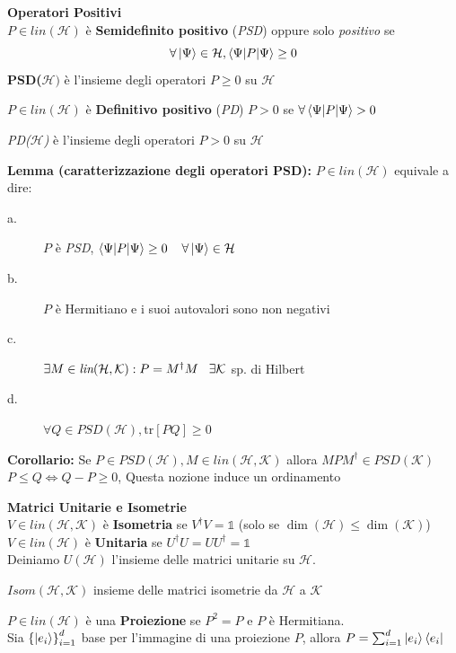 \documentclass{report}
\begin{document}
\medskip
\textbf{Operatori Positivi}
\\$P \in \textit{lin}(\mathcal{H})$ è \textbf{Semidefinito positivo} (\textit{PSD}) oppure solo \textit{positivo} se
$$\forall \ket{\Psi} \in \mathcal{H}, \braket{\Psi|P|\Psi} \ge 0$$
\textbf{PSD($\mathcal{H})$} è l'insieme degli operatori $P\ge 0$ su $\mathcal{H}$
\medskip

$P \in \textit{lin}(\mathcal{H})$ è \textbf{Definitivo positivo} (\textit{PD}) $P > 0$ se $\forall \braket{\Psi|P| \Psi} > 0$

\medskip
\textit{PD($\mathcal{H}$)} è l'insieme degli operatori $P > 0$ su $\mathcal{H}$

\medskip 
\textbf{Lemma (caratterizzazione degli operatori PSD):} $P \in \textit{lin}(\mathcal{H})$ equivale a dire:
\begin{description}
    \item[a.] $P$ è \textit{PSD}, $\braket{\Psi|P|\Psi} \ge 0 \hspace{0.4cm} \forall\ket{\Psi}\in\mathcal{H}$ 
    \item[b.] $P$ è Hermitiano e i suoi autovalori sono non negativi
    \item[c.] $\exists M \in \textit{lin}(\mathcal{H,K}):P=M^\dagger M \hspace{0.3cm} \exists \mathcal{K}$ sp. di Hilbert
    \item[d.] $\forall Q \in PSD(\mathcal{H}), \text{tr}[PQ] \ge 0$
\end{description}
\textbf{Corollario:} Se $P \in PSD(\mathcal{H}), M \in \textit{lin}(\mathcal{H,K})$ allora $MPM^\dagger \in PSD(\mathcal{K})$
\\$P\le Q \Leftrightarrow Q-P \ge 0$, Questa nozione induce un ordinamento

\newpage
\textbf{Matrici Unitarie e Isometrie}
\\$V \in \textit{lin}(\mathcal{H,K})$ è \textbf{Isometria} se $V^\dagger V = \mathbb{1}$ (solo se $\dim(\mathcal{H}) \le\dim(\mathcal{K})$)
\\$V\in \textit{lin}(\mathcal{H})$ è \textbf{Unitaria} se $U^\dagger U = UU^\dagger = \mathbb{1}$
\\Deiniamo $U(\mathcal{H})$ l'insieme delle matrici unitarie su $\mathcal{H}$.

\medskip
$\textit{Isom}(\mathcal{H,K})$ insieme delle matrici isometrie da $\mathcal{H}$ a $\mathcal{K}$

\medskip
$P \in \textit{lin}(\mathcal{H})$ è una \textbf{Proiezione} se $P^2 = P$ e $P$ è Hermitiana.
\\Sia $\left\{\ket{e_i} \right\}^d_{i=1}$ base per l'immagine di una proiezione $P$, allora $P = \sum^d_{i=1}\ket{e_i}\bra{e_i}$
\end{document}
